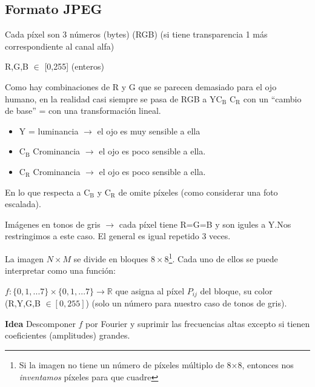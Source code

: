 	\subsection{Formato JPEG}

		\begin{center}
		\end{center}

		Cada píxel son 3 números (bytes) (RGB) (si tiene transparencia 1 más correspondiente al canal alfa)

		R,G,B $\in$ [0,255] (enteros)

		Como hay combinaciones de R y G que se parecen demasiado para el ojo humano, en la realidad casi siempre se pasa de RGB a Y$\text{C}_{\text{B}}$ $\text{C}_{\text{R}}$ con un ``cambio de base'' = con una transformación lineal.

		\begin{itemize}
			\item Y = luminancia $\rightarrow$ el ojo es muy sensible a ella
			\item $\text{C}_{\text{B}}$ Crominancia $\rightarrow$ el ojo es poco sensible a ella.
			\item $\text{C}_{\text{R}}$ Crominancia $\rightarrow$ el ojo es poco sensible a ella.
		\end{itemize}


		En lo que respecta a $\text{C}_{\text{B}}$ y $\text{C}_{\text{R}}$ de omite píxeles (como considerar una foto escalada).

		Imágenes en tonos de gris $\rightarrow$ cada píxel tiene R=G=B y son igules a Y.Nos restringimos a este caso. El general es igual repetido 3 veces.

		\begin{center}
		\end{center}

		La imagen $N \times M$ se divide en bloques $8 \times 8$\footnote{Si la imagen no tiene un número de píxeles múltiplo de 8×8, entonces nos \textit{inventamos} píxeles para que cuadre}. Cada uno de ellos se puede interpretar como una función:

		$f:\{0,1,...7\} \times \{0,1,...7\} \rightarrow \mathbb{R}$ que asigna al píxel $P_{ij}$ del bloque, su color (R,Y,G,B $\in [0,255]$) (solo un número para nuestro caso de tonos de gris).


		\textbf{Idea} Descomponer $f$ por Fourier y suprimir las frecuencias altas excepto si tienen coeficientes (amplitudes) grandes.



